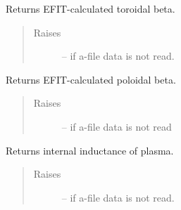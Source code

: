 \documentclass[letterpaper,10pt,english]{sphinxmanual}
\begin{document}
\begin{fulllineitems}
\begin{fulllineitems}
\begin{quote}
\begin{description}
\end{description}\end{quote}

\end{fulllineitems}


\begin{fulllineitems}
\label{eqtools:eqtools.eqdskreader.EqdskReader.getBetaT}
Returns EFIT-calculated toroidal beta.
\begin{quote}\begin{description}
\item[{Raises }] \leavevmode
{} -- 
if a-file data is not read.

\end{description}\end{quote}

\end{fulllineitems}


\begin{fulllineitems}
\label{eqtools:eqtools.eqdskreader.EqdskReader.getBetaP}
Returns EFIT-calculated poloidal beta.
\begin{quote}\begin{description}
\item[{Raises }] \leavevmode
{} -- 
if a-file data is not read

\end{description}\end{quote}

\end{fulllineitems}


\begin{fulllineitems}
\label{eqtools:eqtools.eqdskreader.EqdskReader.getLi}
Returns internal inductance of plasma.
\begin{quote}\begin{description}
\item[{Raises }] \leavevmode
{} -- 
if a-file data is not read.

\end{description}\end{quote}


\end{fulllineitems}
\end{fulllineitems}
\end{document}
